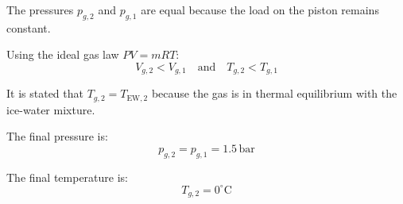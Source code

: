 The pressures \( p_{g,2} \) and \( p_{g,1} \) are equal because the load on the piston remains constant.  

Using the ideal gas law \( PV = mRT \):  
\[
V_{g,2} < V_{g,1} \quad \text{and} \quad T_{g,2} < T_{g,1}
\]  

It is stated that \( T_{g,2} = T_{\text{EW},2} \) because the gas is in thermal equilibrium with the ice-water mixture.  

The final pressure is:  
\[
p_{g,2} = p_{g,1} = 1.5 \, \text{bar}
\]  

The final temperature is:  
\[
T_{g,2} = 0^\circ\text{C}
\]